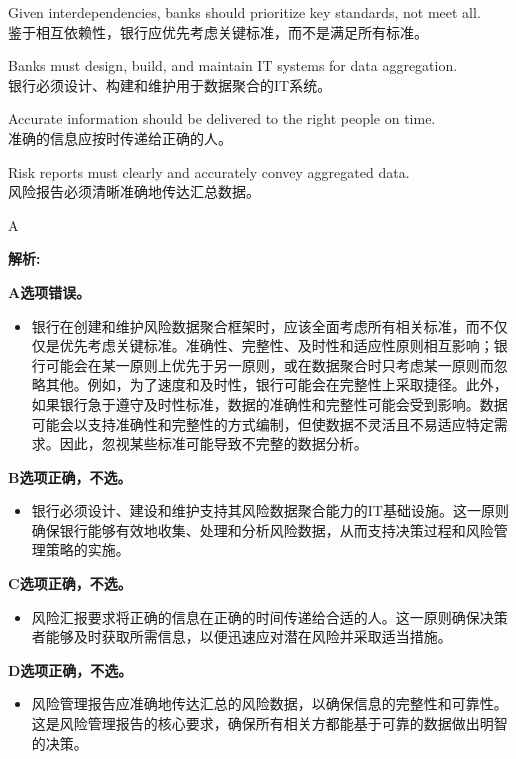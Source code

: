 \documentclass{article}
\newenvironment{explanation}
{\textbf{解析:}\par}
{\par}
\begin{document}
\begin{choices}
    \item Given interdependencies, banks should prioritize key standards, not meet all. \\
    鉴于相互依赖性，银行应优先考虑关键标准，而不是满足所有标准。
    \item Banks must design, build, and maintain IT systems for data aggregation. \\
    银行必须设计、构建和维护用于数据聚合的IT系统。
    \item Accurate information should be delivered to the right people on time. \\
    准确的信息应按时传递给正确的人。
    \item Risk reports must clearly and accurately convey aggregated data. \\
    风险报告必须清晰准确地传达汇总数据。
 \end{choices}

\begin{correctanswer}
    A
\end{correctanswer}

\begin{explanation}
    \textbf{A选项错误。}
    \begin{itemize}
        \item 银行在创建和维护风险数据聚合框架时，应该全面考虑所有相关标准，而不仅仅是优先考虑关键标准。准确性、完整性、及时性和适应性原则相互影响；银行可能会在某一原则上优先于另一原则，或在数据聚合时只考虑某一原则而忽略其他。例如，为了速度和及时性，银行可能会在完整性上采取捷径。此外，如果银行急于遵守及时性标准，数据的准确性和完整性可能会受到影响。数据可能会以支持准确性和完整性的方式编制，但使数据不灵活且不易适应特定需求。因此，忽视某些标准可能导致不完整的数据分析。
    \end{itemize}

    \textbf{B选项正确，不选。}
    \begin{itemize}
        \item 银行必须设计、建设和维护支持其风险数据聚合能力的IT基础设施。这一原则确保银行能够有效地收集、处理和分析风险数据，从而支持决策过程和风险管理策略的实施。
    \end{itemize}

    \textbf{C选项正确，不选。}
    \begin{itemize}
        \item 风险汇报要求将正确的信息在正确的时间传递给合适的人。这一原则确保决策者能够及时获取所需信息，以便迅速应对潜在风险并采取适当措施。
    \end{itemize}

    \textbf{D选项正确，不选。}
    \begin{itemize}
        \item 风险管理报告应准确地传达汇总的风险数据，以确保信息的完整性和可靠性。这是风险管理报告的核心要求，确保所有相关方都能基于可靠的数据做出明智的决策。
    \end{itemize}
\end{explanation}
\end{document}
